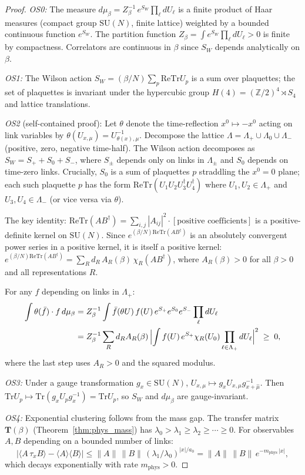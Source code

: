 \documentclass[11pt,a4paper]{amsart}
\theoremstyle{definition}
\newcommand{\SU}{\mathrm{SU}}
\newcommand{\Z}{\mathbb{Z}}
\newcommand{\re}{\mathrm{Re}}
\newcommand{\Tr}{\mathrm{Tr}}
\begin{document}
\begin{proof}
\emph{OS0:} The measure $d\mu_\beta = Z^{-1}_\beta\,e^{S_W}\prod_\ell dU_\ell$
is a finite product of Haar measures (compact group $\SU(N)$, finite lattice)
weighted by a bounded continuous function $e^{S_W}$.  The partition function
$Z_\beta = \int e^{S_W}\prod_\ell dU_\ell > 0$ is finite by compactness.
Correlators are continuous in $\beta$ since $S_W$ depends analytically on $\beta$.

\emph{OS1:} The Wilson action $S_W = (\beta/N)\sum_p\re\Tr U_p$ is a sum over
plaquettes; the set of plaquettes is invariant under the hypercubic group
$H(4) = (\Z/2)^4\rtimes S_4$ and lattice translations. \checkmark

\emph{OS2} (self-contained proof):
Let $\theta$ denote the time-reflection $x^0 \mapsto -x^0$ acting on link
variables by $\theta(U_{x,\mu}) = U_{\theta(x),\mu}^{-1}$.
Decompose the lattice $\Lambda = \Lambda_+ \cup \Lambda_0 \cup \Lambda_-$
(positive, zero, negative time-half).  The Wilson action decomposes as
$S_W = S_+ + S_0 + S_-$, where $S_\pm$ depends only on links in $\Lambda_\pm$
and $S_0$ depends on time-zero links.  Crucially, $S_0$ is a sum of plaquettes
$p$ straddling the $x^0=0$ plane; each such plaquette $p$ has the form
$\re\Tr(U_1 U_2 U_3^\dagger U_4^\dagger)$ where $U_1,U_2\in\Lambda_+$
and $U_3,U_4\in\Lambda_-$ (or vice versa via $\theta$).

The key identity: $\re\Tr(AB^\dagger) = \sum_{i,j}|A_{ij}|^2 \cdot
[\text{positive coefficients}]$ is a positive-definite kernel on $\SU(N)$.
Since $e^{(\beta/N)\re\Tr(AB^\dagger)}$ is an absolutely convergent power series
in a positive kernel, it is itself a positive kernel:
$e^{(\beta/N)\re\Tr(AB^\dagger)} = \sum_R d_R\,A_R(\beta)\,\chi_R(AB^\dagger)$,
where $A_R(\beta) > 0$ for all $\beta > 0$ and all representations $R$.

For any $f$ depending on links in $\Lambda_+$:
\begin{align*}
  \int \theta(\bar f)\cdot f\,d\mu_\beta
  &= Z_\beta^{-1}\int \bar f(\theta U)\,f(U)\,e^{S_+}e^{S_0}e^{S_-}
    \prod_\ell dU_\ell \\
  &= Z_\beta^{-1}\sum_R d_R A_R(\beta)\,
    \Bigl|\int f(U)\,e^{S_+}\chi_R(U_0)\prod_{\ell\in\Lambda_+}dU_\ell\Bigr|^2
  \;\ge\; 0,
\end{align*}
where the last step uses $A_R > 0$ and the squared modulus. \checkmark

\emph{OS3:} Under a gauge transformation $g_x\in\SU(N)$,
$U_{x,\mu}\mapsto g_x U_{x,\mu} g_{x+\hat\mu}^{-1}$.
Then $\Tr U_p \mapsto \Tr(g_x U_p g_x^{-1}) = \Tr U_p$, so
$S_W$ and $d\mu_\beta$ are gauge-invariant. \checkmark

\emph{OS4:} Exponential clustering follows from the mass gap.
The transfer matrix $\mathbf{T}(\beta)$ (Theorem~\ref{thm:phys_mass}) has
$\lambda_0 > \lambda_1 \ge \lambda_2 \ge \cdots \ge 0$.  For observables
$A,B$ depending on a bounded number of links:
\[
  |\langle A\,\tau_x B\rangle - \langle A\rangle\langle B\rangle|
  \le \|A\|\,\|B\|\,(\lambda_1/\lambda_0)^{|x|/a_0}
  = \|A\|\,\|B\|\,e^{-m_{\mathrm{phys}}\,|x|},
\]
which decays exponentially with rate $m_{\mathrm{phys}} > 0$. \checkmark
\end{proof}
\end{document}

